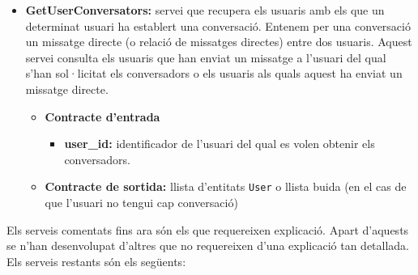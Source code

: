 \begin{itemize}
			\item \textbf{GetUserConversators:} servei que recupera els usuaris amb els que un determinat usuari ha establert una conversació. Entenem per una conversació un missatge directe (o relació de missatges directes) entre dos usuaris. Aquest servei consulta els usuaris que han enviat un missatge a l'usuari del qual s'han sol·licitat els conversadors o els usuaris als quals aquest ha enviat un missatge directe.
			
				\begin{itemize}
					\item \textbf{Contracte d'entrada}
						\begin{itemize}
							\item \textbf{user\_id:} identificador de l'usuari del qual es volen obtenir els conversadors.
						\end{itemize}
					\item \textbf{Contracte de sortida:} llista d'entitats \texttt{User} o llista buida (en el cas de que l'usuari no tengui cap conversació)
				\end{itemize}
			
		\end{itemize}
		
		Els serveis comentats fins ara són els que requereixen explicació. Apart d'aquests se n'han desenvolupat d'altres que no requereixen d'una explicació tan detallada. Els serveis restants són els següents:
		

